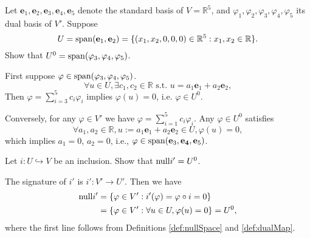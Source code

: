 \begin{exc}
  Let $\mathbf{e}_1, \mathbf{e}_2, \mathbf{e}_3, \mathbf{e}_4, \mathbf{e}_5$
   denote the standard basis of $V=\mathbb{R}^5$,
   and $\varphi_1, \varphi_2, \varphi_3, \varphi_4, \varphi_5$
   its dual basis of $V'$.
  Suppose 
  \begin{displaymath}
    U = \mathrm{span}(\mathbf{e}_1, \mathbf{e}_2) = \{(x_1,x_2,0,0,0)\in
    \mathbb{R}^5: x_1, x_2\in \mathbb{R}\}.
  \end{displaymath}
  Show that $U^0 = \mathrm{span}(\varphi_3, \varphi_4, \varphi_5)$.
\end{exc}
\begin{solution}
  First suppose $\varphi\in \mathrm{span}(\varphi_3, \varphi_4, \varphi_5)$.
  \begin{displaymath}
    \forall u\in U, \exists c_1,c_2\in \mathbb{R} \text{ s.t. }
    u=a_1\mathbf{e}_1 + a_2\mathbf{e}_2,
  \end{displaymath}
  Then $\varphi=\sum_{i=3}^5 c_i \varphi_i$ implies $\varphi(u)=0$,
   i.e. $\varphi\in U^0$.

  Conversely, for any $\varphi\in V'$ 
   we have $\varphi=\sum_{i=1}^5 c_i \varphi_i$. 
  Any $\varphi\in U^0$ satisfies
  \begin{displaymath}
    \forall a_1,a_2\in \mathbb{R}, u:=a_1\mathbf{e}_1 + a_2\mathbf{e}_2 \in U, 
    \varphi(u) = 0,
  \end{displaymath}
  which implies $a_1=0$, $a_2=0$,
  i.e., $\varphi\in \mathrm{span}(\mathbf{e}_3, \mathbf{e_4}, \mathbf{e}_5)$.
\end{solution}

\begin{exc}
  \label{exc:nullspaceOfInclusionDual}
  Let $i: U\hookrightarrow V$ be an inclusion.
  Show that $\mathrm{null} i' = U^0$.
\end{exc}
\begin{solution}
  The signature of $i'$ is $i': V'\rightarrow U'$.
  Then we have
  \begin{align*}
    \mathrm{null} i' &= \{\varphi\in V': i'(\varphi)= \varphi\circ i =0\}
               \\
             &= \{\varphi\in V': \forall u\in U,
               \varphi(u) =0\} = U^0,
  \end{align*}
  where the first line follows
  from Definitions \ref{def:nullSpace} and \ref{def:dualMap}.
\end{solution}

